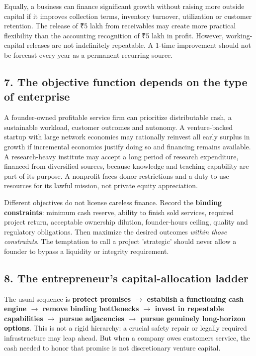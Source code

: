 Equally, a business can finance significant growth without raising more outside capital if it improves collection terms, inventory turnover, utilization or customer retention. The release of ₹5 lakh from receivables may create more practical flexibility than the accounting recognition of ₹5 lakh in profit. However, working-capital releases are not indefinitely repeatable. A 1-time improvement should not be forecast every year as a permanent recurring source.

\subsection{7. The objective function depends on the type of enterprise}


A founder-owned profitable service firm can prioritize distributable cash, a sustainable workload, customer outcomes and autonomy. A venture-backed startup with large network economies may rationally reinvest all early surplus in growth if incremental economics justify doing so and financing remains available. A research-heavy institute may accept a long period of research expenditure, financed from diversified sources, because knowledge and teaching capability are part of its purpose. A nonprofit faces donor restrictions and a duty to use resources for its lawful mission, not private equity appreciation.

Different objectives do not license careless finance. Record the \textbf{binding constraints}: minimum cash reserve, ability to finish sold services, required project return, acceptable ownership dilution, founder-hours ceiling, quality and regulatory obligations. Then maximize the desired outcomes \textit{within those constraints}. The temptation to call a project 'strategic' should never allow a founder to bypass a liquidity or integrity requirement.

\subsection{8. The entrepreneur's capital-allocation ladder}


The usual sequence is \textbf{protect promises $\to$ establish a functioning cash engine $\to$ remove binding bottlenecks $\to$ invest in repeatable capabilities $\to$ pursue adjacencies $\to$ pursue genuinely long-horizon options}. This is not a rigid hierarchy: a crucial safety repair or legally required infrastructure may leap ahead. But when a company owes customers service, the cash needed to honor that promise is not discretionary venture capital.

